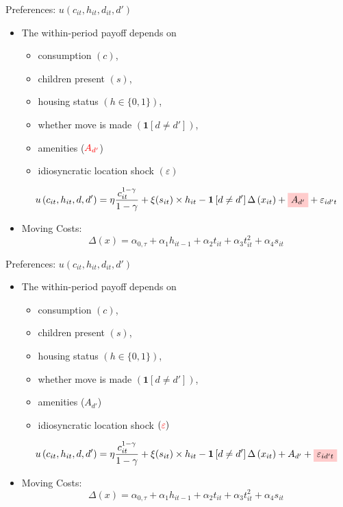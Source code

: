 \documentclass[12pt,english, aspectratio=169]{beamer}
\begin{document}
\begin{frame}{Preferences: $u(c_{it},h_{it},d_{it},d')$}
\begin{itemize}
\item The within-period payoff depends on 

\begin{itemize}
\item consumption $(c)$, 
\item children present $(s)$, 
\item housing status $(h\in\{0,1\})$, 
\item whether move is made \textrm{$\left(\mathbf{1}\left[d\neq d'\right]\right)$,}
\item amenities (${\color{red}{A_{d'}}}$)
\item idiosyncratic location shock $\left(\varepsilon\right)$
\end{itemize}
\[
u\left(c_{it},h_{it},d,d'\right)=\eta \frac{c_{it}^{1-\gamma}}{1-\gamma} + \xi(s_{it})\times h_{it} - 
\mathbf{1}\left[d\neq d'\right]\Delta\left(x_{it}\right) + 
\tikz[baseline]{
            \node[fill=red!20,anchor=base] (t1)
            {$ A_{d'} $};
        } + \varepsilon_{id't}
\]

\item Moving Costs:
\[
\Delta(x)=\alpha_{0,\tau}+\alpha_{1}h_{it-1}+\alpha_{2}t_{it}+\alpha_{3}t_{it}^{2}+\alpha_{4}s_{it}
\]

\end{itemize}
\end{frame}
\begin{frame}{Preferences: $u(c_{it},h_{it},d_{it},d')$}
\begin{itemize}
\item The within-period payoff depends on 

\begin{itemize}
\item consumption $(c)$, 
\item children present $(s)$, 
\item housing status $(h\in\{0,1\})$, 
\item whether move is made \textrm{$\left(\mathbf{1}\left[d\neq d'\right]\right)$,}
\item amenities ($A_{d'}$)
\item idiosyncratic location shock $\left({\color{red}{\varepsilon}}\right)$
\end{itemize}
\[
u\left(c_{it},h_{it},d,d'\right)=\eta \frac{c_{it}^{1-\gamma}}{1-\gamma} + \xi(s_{it})\times h_{it} - 
\mathbf{1}\left[d\neq d'\right]\Delta\left(x_{it}\right) + A_{d'}  +
\tikz[baseline]{
            \node[fill=red!20,anchor=base] (t1)
            {$\varepsilon_{id't} $};
        } 
\]

\item Moving Costs:
\[
\Delta(x)=\alpha_{0,\tau}+\alpha_{1}h_{it-1}+\alpha_{2}t_{it}+\alpha_{3}t_{it}^{2}+\alpha_{4}s_{it}
\]

\end{itemize}
\end{frame}
\end{document}
